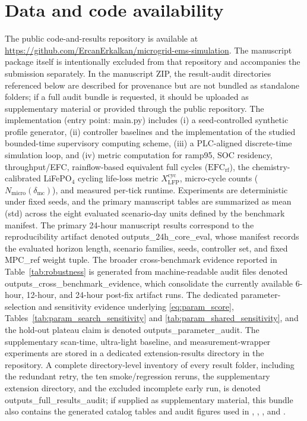 \documentclass[preprint,12pt]{elsarticle}
\def\texttt#1{#1}%
\newcommand{\EFCrf}{\mathrm{EFC}_{\mathrm{rf}}}
\newcommand{\Nmicro}{N_{\mathrm{micro}}}
\newcommand{\dmc}{\delta_{\mathrm{mc}}}
\begin{document}
\section*{Data and code availability}
The public code-and-results repository is available at \url{https://github.com/ErcanErkalkan/microgrid-ems-simulation}. The manuscript package itself is intentionally excluded from that repository and accompanies the submission separately. In the manuscript ZIP, the result-audit directories referenced below are described for provenance but are not bundled as standalone folders; if a full audit bundle is requested, it should be uploaded as supplementary material or provided through the public repository. The implementation (entry point: \texttt{main.py}) includes (i) a seed-controlled synthetic profile generator, (ii) controller baselines and the implementation of the studied bounded-time supervisory computing scheme, (iii) a PLC-aligned discrete-time simulation loop, and (iv) metric computation for ramp95, SOC residency, throughput/EFC, rainflow-based equivalent full cycles ($\EFCrf$), the chemistry-calibrated LiFePO$_4$ cycling life-loss metric $X_{\mathrm{LFP}}^{\mathrm{cyc}}$, micro-cycle counts ($\Nmicro(\dmc)$), and measured per-tick runtime. Experiments are deterministic under fixed seeds, and the primary manuscript tables are summarized as mean (std) across the eight evaluated scenario-day units defined by the benchmark manifest. The primary 24-hour manuscript results correspond to the reproducibility artifact denoted \texttt{outputs\_24h\_core\_eval}, whose manifest records the evaluated horizon length, scenario families, seeds, controller set, and fixed \texttt{MPC\_ref} weight tuple. The broader cross-benchmark evidence reported in Table~\ref{tab:robustness} is generated from machine-readable audit files denoted \texttt{outputs\_cross\_benchmark\_evidence}, which consolidate the currently available 6-hour, 12-hour, and 24-hour post-fix artifact runs. The dedicated parameter-selection and sensitivity evidence underlying \eqref{eq:param_score}, Tables~\ref{tab:param_search_sensitivity} and \ref{tab:param_shared_sensitivity}, and the hold-out plateau claim is denoted \texttt{outputs\_parameter\_audit}. The supplementary scan-time, ultra-light baseline, and measurement-wrapper experiments are stored in a dedicated extension-results directory in the repository. A complete directory-level inventory of every result folder, including the redundant retry, the ten smoke/regression reruns, the supplementary extension directory, and the excluded incomplete early run, is denoted \texttt{outputs\_full\_results\_audit}; if supplied as supplementary material, this bundle also contains the generated catalog tables and audit figures used in , , , and .
\end{document}
